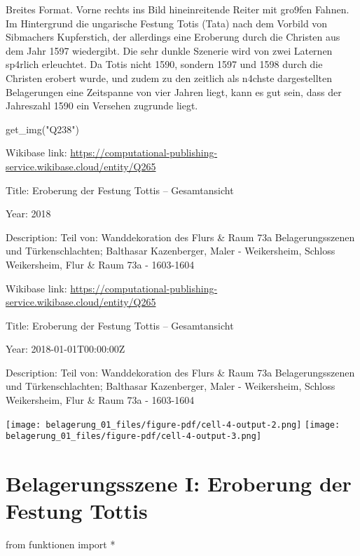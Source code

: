 \documentclass[
  letterpaper,
]{book}
\newenvironment{Shaded}{\begin{snugshade}}{\end{snugshade}}
\newcommand{\ImportTok}[1]{\textcolor[rgb]{0.00,0.46,0.62}{#1}}
\newcommand{\NormalTok}[1]{\textcolor[rgb]{0.00,0.23,0.31}{#1}}
\newcommand{\OperatorTok}[1]{\textcolor[rgb]{0.37,0.37,0.37}{#1}}
\newcommand{\StringTok}[1]{\textcolor[rgb]{0.13,0.47,0.30}{#1}}
\begin{document}
Breites Format. Vorne rechts ins Bild hineinreitende Reiter mit
gro\x9fen Fahnen. Im Hintergrund die ungarische Festung Totis (Tata)
nach dem Vorbild von Sibmachers Kupferstich, der allerdings eine
Eroberung durch die Christen aus dem Jahr 1597 wiedergibt. Die sehr
dunkle Szenerie wird von zwei Laternen sp\xa4rlich erleuchtet. Da
Totis nicht 1590, sondern 1597 und 1598 durch die Christen erobert
wurde, und zudem zu den zeitlich als n\xa4chste dargestellten
Belagerungen eine Zeitspanne von vier Jahren liegt, kann es gut sein,
dass der Jahreszahl 1590 ein Versehen zugrunde liegt.

\begin{Shaded}
\begin{Highlighting}[]
\NormalTok{get\_img(}\StringTok{"Q238"}\NormalTok{)}
\end{Highlighting}
\end{Shaded}

Wikibase link:
\url{https://computational-publishing-service.wikibase.cloud/entity/Q265}

Title: Eroberung der Festung Tottis -- Gesamtansicht

Year: 2018

Description: Teil von: Wanddekoration des Flurs \& Raum 73a
Belagerungsszenen und Türkenschlachten; Balthasar Kazenberger, Maler -
Weikersheim, Schloss Weikersheim, Flur \& Raum 73a - 1603-1604

Wikibase link:
\url{https://computational-publishing-service.wikibase.cloud/entity/Q265}

Title: Eroberung der Festung Tottis -- Gesamtansicht

Year: 2018-01-01T00:00:00Z

Description: Teil von: Wanddekoration des Flurs \& Raum 73a
Belagerungsszenen und Türkenschlachten; Balthasar Kazenberger, Maler -
Weikersheim, Schloss Weikersheim, Flur \& Raum 73a - 1603-1604

\texttt{[image: belagerung\_01\_files/figure-pdf/cell-4-output-2.png]}
\texttt{[image: belagerung\_01\_files/figure-pdf/cell-4-output-3.png]}


\chapter{Belagerungsszene I: Eroberung der Festung
Tottis}\label{belagerungsszene-i-eroberung-der-festung-tottis-1}

\begin{Shaded}
\begin{Highlighting}[]
\ImportTok{from}\NormalTok{ funktionen }\ImportTok{import} \OperatorTok{*}
\end{Highlighting}
\end{Shaded}
\end{document}

